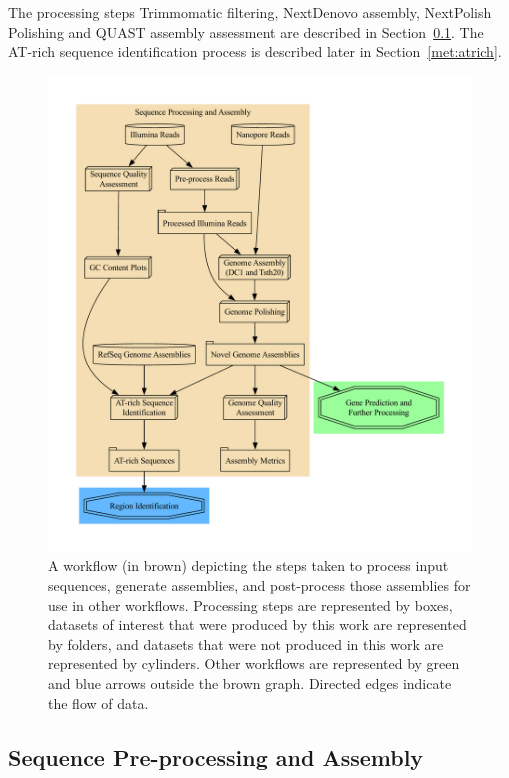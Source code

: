 The processing steps Trimmomatic filtering, NextDenovo assembly,
NextPolish Polishing and QUAST assembly assessment are described in
Section~\ref{met:seq-process}. The AT-rich sequence identification
process is described later in Section~\ref{met:atrich}.

\begin{figure}
  \centering
  \includegraphics[width=\textwidth]{figures/assembly-met.pdf}
  \caption[Sequence assembly and processing workflow]{A workflow (in brown) depicting the steps taken to process
    input sequences, generate assemblies, and post-process those
    assemblies for use in other workflows. Processing steps are
    represented by boxes, datasets of interest that were produced by
    this work are represented by folders, and datasets that were not
    produced in this work are represented by cylinders. Other
    workflows are represented by green and blue arrows outside the
    brown graph. Directed edges indicate the flow of data.}\label{fig:seq-workflow}
\end{figure}

\subsection{Sequence Pre-processing and Assembly}\label{met:seq-process}

